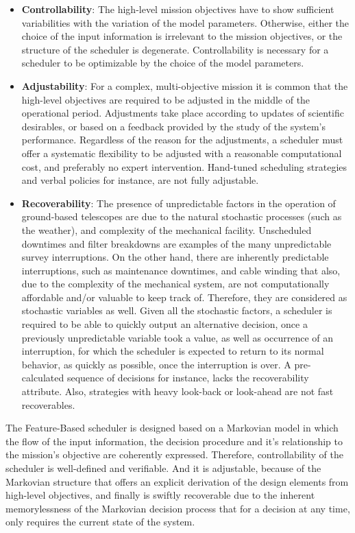 \documentclass[11pt]{article}
\theoremstyle{definition}
\begin{document}
\begin{itemize}
\item \textbf{Controllability}: The high-level mission objectives have to show sufficient variabilities with the variation of the model parameters. Otherwise, either the choice of the input  information is irrelevant to the mission objectives, or the structure of the scheduler is degenerate. Controllability is necessary for a scheduler to be optimizable by the choice of the model parameters. 
\item \textbf{Adjustability}: For a complex, multi-objective mission it is common that the high-level objectives are required to be adjusted in the middle of the operational period. Adjustments take place according to updates of scientific desirables, or based on a feedback provided by the study of the system's performance. Regardless of the reason for the adjustments, a scheduler must offer a systematic flexibility to be adjusted with a reasonable computational cost, and preferably no expert intervention. Hand-tuned scheduling strategies and verbal policies for instance, are not fully adjustable.
\item \textbf{Recoverability}: The presence of unpredictable factors in the operation of ground-based telescopes are due to the natural stochastic processes (such as the weather), and complexity of the mechanical facility. Unscheduled downtimes and filter breakdowns are examples of the many unpredictable survey interruptions. On the other hand, there are inherently predictable interruptions, such as maintenance downtimes, and cable winding that also, due to the complexity of the mechanical system, are not computationally affordable and/or valuable to keep track of. Therefore, they are considered as stochastic variables as well. Given all the stochastic factors, a scheduler is required to be able to quickly output an alternative decision, once a previously unpredictable variable took a value, as well as occurrence of an interruption, for which the scheduler is expected to return to its normal behavior, as quickly as possible, once the interruption is over. A pre-calculated sequence of decisions for instance, lacks the recoverability attribute. Also, strategies with heavy look-back or look-ahead are not fast recoverables. 
\end{itemize}
The Feature-Based scheduler is designed based on a Markovian model in which the flow of the input information, the decision procedure and it's relationship to the mission's objective are coherently expressed. Therefore, controllability of the scheduler is well-defined and verifiable. And it is adjustable, because of the Markovian structure that offers an explicit derivation of the design elements from high-level objectives, and finally is swiftly recoverable due to the inherent memorylessness of the Markovian decision process that for a decision at any time, only requires the current state of the system.
\end{document}
